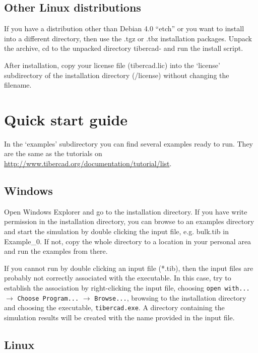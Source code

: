 \subsection*{Other Linux distributions}

If you have a distribution other than Debian 4.0 ``etch'' or you want to install \TiberCAD{}
into a different directory, then use the .tgz or .tbz installation packages.
Unpack the archive, cd to the unpacked directory tibercad-\version{} and run the
install script.

  After installation, copy your license file (tibercad.lic) into the `license'
subdirectory of the \TiberCAD{} installation directory (\instpath/license) without
changing the filename.


  

\section*{Quick start guide}

In the `examples' subdirectory you can find several examples ready to run.
They are the same as
the tutorials on \url{http://www.tibercad.org/documentation/tutorial/list}.

\subsection*{Windows}

Open Windows Explorer and go to the \TiberCAD{} installation directory. 
If you have write permission in the installation directory, you can browse to
an examples directory and start the simulation by double clicking the input file, e.g. bulk.tib in Example\_0.
If not, copy the whole directory to a location in your personal area and run the
examples from there.

  If you cannot run \TiberCAD{} by double clicking an input file (*.tib), then the
input files are probably not correctly associated with the \TiberCAD{} executable.
In this case, try to establish the association by right-clicking the input file,
choosing \verb+open with...+ $\rightarrow$ \verb+Choose Program...+ $\rightarrow$ \verb+Browse...+, browsing to the \TiberCAD{} installation directory and choosing the \TiberCAD{} executable, \verb+tibercad.exe+.
A directory containing the simulation results will be created with the name provided in the input file.


\subsection*{Linux}

